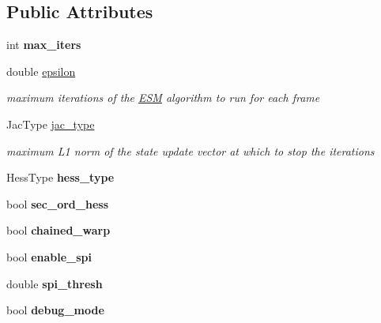 \subsection*{Public Attributes}
\begin{DoxyCompactItemize}
\item 
\hypertarget{structESMParams_ae103754c629f35a8d9aa56c5911a8dad}{int {\bfseries max\-\_\-iters}}\label{structESMParams_ae103754c629f35a8d9aa56c5911a8dad}

\item 
\hypertarget{structESMParams_ac62ee111bea1d568bb7dda472b9a359d}{double \hyperlink{structESMParams_ac62ee111bea1d568bb7dda472b9a359d}{epsilon}}\label{structESMParams_ac62ee111bea1d568bb7dda472b9a359d}

\begin{DoxyCompactList}\small\item\em maximum iterations of the \hyperlink{classESM}{E\-S\-M} algorithm to run for each frame \end{DoxyCompactList}\item 
\hypertarget{structESMParams_ac8e31e30cd5c89a5a8a869fcea26c106}{Jac\-Type \hyperlink{structESMParams_ac8e31e30cd5c89a5a8a869fcea26c106}{jac\-\_\-type}}\label{structESMParams_ac8e31e30cd5c89a5a8a869fcea26c106}

\begin{DoxyCompactList}\small\item\em maximum L1 norm of the state update vector at which to stop the iterations \end{DoxyCompactList}\item 
\hypertarget{structESMParams_acfd1104eba9263a6e015c01dad0e9a6d}{Hess\-Type {\bfseries hess\-\_\-type}}\label{structESMParams_acfd1104eba9263a6e015c01dad0e9a6d}

\item 
\hypertarget{structESMParams_a5b15bab42649c16dd14908f6480c3249}{bool {\bfseries sec\-\_\-ord\-\_\-hess}}\label{structESMParams_a5b15bab42649c16dd14908f6480c3249}

\item 
\hypertarget{structESMParams_abfad3a90dfe1c58427af20671b996561}{bool {\bfseries chained\-\_\-warp}}\label{structESMParams_abfad3a90dfe1c58427af20671b996561}

\item 
\hypertarget{structESMParams_a37619667562850108fe2c1900ed631ad}{bool {\bfseries enable\-\_\-spi}}\label{structESMParams_a37619667562850108fe2c1900ed631ad}

\item 
\hypertarget{structESMParams_a1138edd38f5a85ccae1cf602abfac851}{double {\bfseries spi\-\_\-thresh}}\label{structESMParams_a1138edd38f5a85ccae1cf602abfac851}

\item 
\hypertarget{structESMParams_a9d621495901e5bd38e3d0ce4ee419b8f}{bool {\bfseries debug\-\_\-mode}}\label{structESMParams_a9d621495901e5bd38e3d0ce4ee419b8f}

\end{DoxyCompactItemize}


